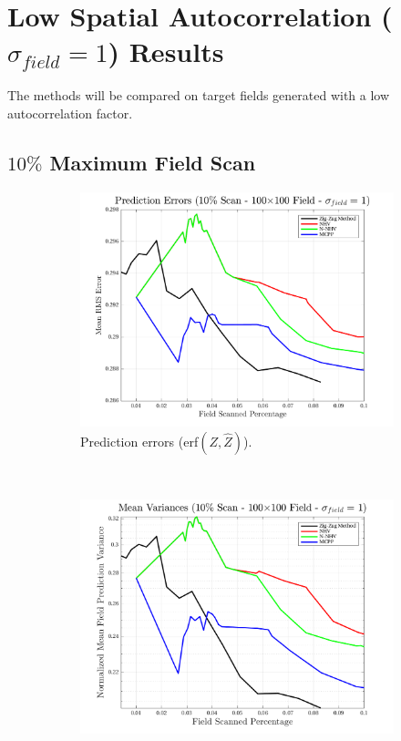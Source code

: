 
\section{Low Spatial Autocorrelation ($\sigma_{field} = 1$) Results}
The methods will be compared on target fields generated with a low autocorrelation factor.

\clearpage
\subsection{$10\%$ Maximum Field Scan}
\begin{figure}[htb!]
    \centering
    \begin{subfigure}[t]{0.65\textwidth}
        \centering
        \includegraphics[width=\linewidth]{figures/hbresults/pred_errs_10p_100x100_sf_1_seed_2.png}
        \captionsetup{skip=0.20\baselineskip,size=footnotesize}
        \caption{Prediction errors (erf$(Z,\hat{Z})$).}
        \label{fig:prederrs_sigma1_p10_s2}
    \end{subfigure}%
    \\
    \begin{subfigure}[t]{0.65\textwidth}
        \centering
        \includegraphics[width=\linewidth]{figures/hbresults/vars_10p_100x100_sf_1_seed_2.png}

\end{subfigure}
\end{figure}
